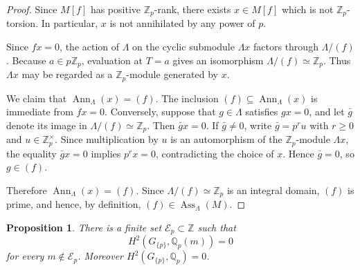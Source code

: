 \documentclass[11pt]{amsart}
\numberwithin{equation}{section}
\newcommand{\Z}{\mathbb Z}
\newcommand{\Qp}{\mathbb Q_p}
\newcommand{\Zp}{\mathbb Z_p}
\newcommand{\cE}{\mathcal E}
\newcommand{\Ann}{\operatorname{Ann}}
\newcommand{\Ass}{\operatorname{Ass}}
\newtheorem{proposition}[theorem]{Proposition}
\theoremstyle{definition}
\begin{document}
\begin{proof}
Since $M[f]$ has positive $\Zp$-rank, there exists
$x\in M[f]$ which is not $\Zp$-torsion. In particular, $x$ is not
annihilated by any power of $p$.

Since $fx=0$, the action of $\Lambda$ on the cyclic submodule
$\Lambda x$ factors through $\Lambda/(f)$. Because $a\in p\Zp$,
evaluation at $T=a$ gives an isomorphism
$\Lambda/(f)\simeq\Zp$. Thus $\Lambda x$ may be regarded as a
$\Zp$-module generated by $x$.

We claim that $\Ann_\Lambda(x)=(f)$. The inclusion
$(f)\subseteq\Ann_\Lambda(x)$ is immediate from $fx=0$. Conversely,
suppose that $g\in\Lambda$ satisfies $gx=0$, and let $\bar g$ denote
its image in $\Lambda/(f)\simeq\Zp$. Then $\bar g x=0$. If
$\bar g\neq0$, write $\bar g=p^r u$ with $r\geq0$ and
$u\in\Zp^\times$. Since multiplication by $u$ is an automorphism of
the $\Zp$-module $\Lambda x$, the equality $\bar g x=0$ implies
$p^r x=0$, contradicting the choice of $x$. Hence $\bar g=0$, so
$g\in(f)$.

Therefore $\Ann_\Lambda(x)=(f)$. Since
$\Lambda/(f)\simeq\Zp$ is an integral domain, $(f)$ is prime, and
hence, by definition, $(f)\in\Ass_\Lambda(M)$.
\end{proof}

\begin{proposition}\label{prop:finite-exceptional}
There is a finite set $\cE_p\subset\Z$ such that
\begin{equation}\label{eq:rational-H2-good}
 H^2(G_{\{p\}},\Qp(m))=0
\end{equation}
for every $m\notin\cE_p$.  Moreover $H^2(G_{\{p\}},\Qp)=0$.
\end{proposition}
\end{document}
